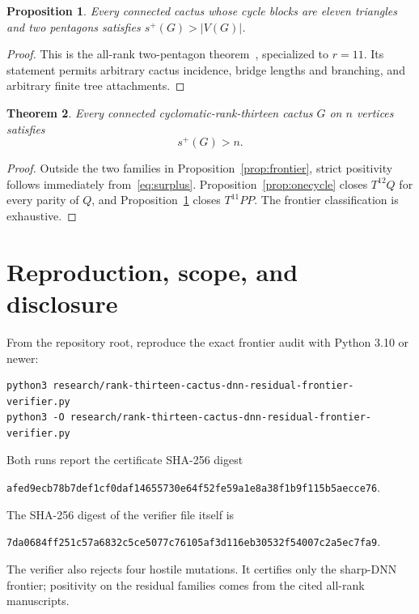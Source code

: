 \documentclass[11pt]{article}
\newtheorem{theorem}{Theorem}[section]
\newtheorem{proposition}[theorem]{Proposition}
\newcommand{\splus}{s^+}
\begin{document}
\begin{proposition}\label{prop:twopent}
Every connected cactus whose cycle blocks are eleven triangles and two
pentagons satisfies $\splus(G)>|V(G)|$.
\end{proposition}

\begin{proof}
This is the all-rank two-pentagon theorem~\cite{TwoPent}, specialized to
$r=11$.  Its statement permits arbitrary cactus incidence, bridge lengths and
branching, and arbitrary finite tree attachments.
\end{proof}

\begin{theorem}\label{thm:main}
Every connected cyclomatic-rank-thirteen cactus $G$ on $n$ vertices satisfies
\[
 \boxed{\splus(G)>n}.
\]
\end{theorem}

\begin{proof}
Outside the two families in Proposition~\ref{prop:frontier}, strict positivity
follows immediately from~\eqref{eq:surplus}.  Proposition~\ref{prop:onecycle}
closes $T^{12}Q$ for every parity of $Q$, and Proposition~\ref{prop:twopent}
closes $T^{11}PP$.  The frontier classification is exhaustive.
\end{proof}

\section{Reproduction, scope, and disclosure}

From the repository root, reproduce the exact frontier audit with Python 3.10
or newer:
\begin{verbatim}
python3 research/rank-thirteen-cactus-dnn-residual-frontier-verifier.py
python3 -O research/rank-thirteen-cactus-dnn-residual-frontier-verifier.py
\end{verbatim}
Both runs report the certificate SHA-256 digest
\begin{center}
\texttt{afed9ecb78b7def1cf0daf14655730e64f52fe59a1e8a38f1b9f115b5aecce76}.
\end{center}
The SHA-256 digest of the verifier file itself is
\begin{center}
\texttt{7da0684ff251c57a6832c5ce5077c76105af3d116eb30532f54007c2a5ec7fa9}.
\end{center}
The verifier also rejects four hostile mutations.  It certifies only the
sharp-DNN frontier; positivity on the residual families comes from the cited
all-rank manuscripts.
\end{document}
